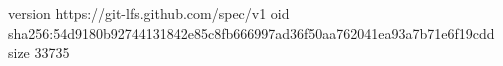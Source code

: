 version https://git-lfs.github.com/spec/v1
oid sha256:54d9180b92744131842e85c8fb666997ad36f50aa762041ea93a7b71e6f19cdd
size 33735
